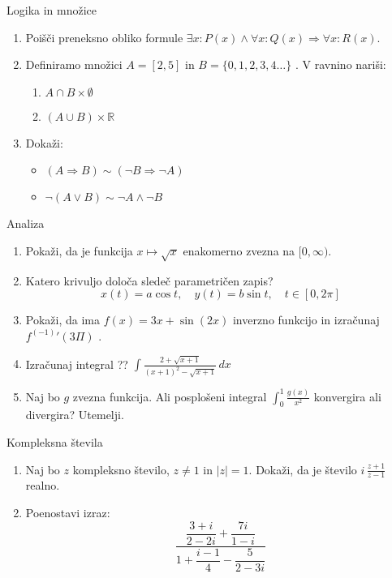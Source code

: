 \begin{frame}{Logika in množice}
	\begin{enumerate}
		\item
		Poišči preneksno obliko formule $ \exists x : P(x) \land \forall x: Q(x) \Rightarrow \forall x: R(x)$.
		\item 
		Definiramo množici $A = [2, 5]$ in $B=\{0,1,2,3,4\ldots\}$ .
		V ravnino nariši:
		\begin{enumerate}
		   \item $A \cap B \times \emptyset$
		   \item $(A \cup B) \times \mathbb{R}$
		\end{enumerate}
		\item
		Dokaži:
		\begin{itemize}
			\item $(A \Rightarrow B) \sim (\lnot B \Rightarrow \lnot A)$
			\item $\lnot(A \lor B) \sim \lnot A \land \lnot B$
		\end{itemize}
	\end{enumerate}
\end{frame}

\begin{frame}{Analiza}
	\begin{enumerate}
		\item
		Pokaži, da je funkcija $x \mapsto \sqrt{x}$ enakomerno zvezna na $ [0, \infty) $.
		\item 
		Katero krivuljo določa sledeč parametričen zapis?
		$$
		   x(t) = a \cos t, \quad %
		   y(t) = b \sin t, \quad %
		   t \in [0, 2 \pi]
		$$ 
		\item
		Pokaži, da ima $f(x) = 3x+\sin(2x)$ inverzno funkcijo in izračunaj $ f^(-1)'(3\Pi)$ .
		
		\item
		Izračunaj integral 
		??
	    $ \displaystyle \int \frac{2+\sqrt{x+1}}{(x+1)^2-\sqrt{x+1}} \, dx$ 
		\item 
		Naj bo $g$ zvezna funkcija. Ali posplošeni integral 
		$ \int_{0}^{1} \frac{g(x)}{x^2}$
		konvergira ali divergira? Utemelji.
	\end{enumerate}
\end{frame}

\begin{frame}{Kompleksna števila}
	\begin{enumerate}
		\item
		Naj bo $z$ kompleksno število, $z \ne 1$ in $ |z| = 1$.
		Dokaži, da je število \( i \, \frac{z+1}{z-1} \) realno.
		\item
		Poenostavi izraz:
		$$ \dfrac{\dfrac{3+i}{2-2i} + \dfrac{7i}{1-i}}{1 + \dfrac{i-1}{4} - \dfrac{5}{2-3i}} $$
	\end{enumerate}
\end{frame}